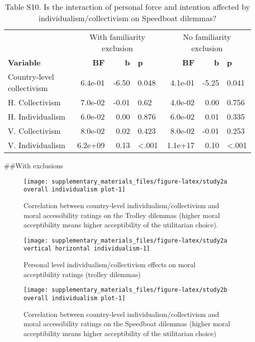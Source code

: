 \documentclass[
]{article}
\begin{document}
\begin{table}[H]

\caption{\label{tab:analysis individual + country level study 2b}Table S10. Is the interaction of personal force and intention affected by individualism/collectivism on Speedboat dilemmas?}
\begin{tabular}[t]{lrrlrrl}
\toprule
\multicolumn{1}{c}{ } & \multicolumn{3}{c}{With familiarity exclusion} & \multicolumn{3}{c}{No familiarity exclusion} \\
\cmidrule(l{3pt}r{3pt}){2-4} \cmidrule(l{3pt}r{3pt}){5-7}
\textbf{Variable} & \textbf{BF} & \textbf{b} & \textbf{p} & \textbf{BF} & \textbf{b} & \textbf{p}\\
\midrule
Country-level collectivism & 6.4e-01 & -6.50 & 0.048 & 4.1e-01 & -5.25 & 0.041\\
H. Collectivism & 7.0e-02 & -0.01 & 0.62 & 4.0e-02 & 0.00 & 0.756\\
H. Individualism & 6.0e-02 & 0.00 & 0.876 & 6.0e-02 & 0.01 & 0.335\\
V. Collectivism & 8.0e-02 & 0.02 & 0.423 & 8.0e-02 & -0.01 & 0.253\\
V. Individualism & 6.2e+09 & 0.13 & <.001 & 1.1e+17 & 0.10 & <.001\\
\bottomrule
\end{tabular}
\end{table}

\#\#With exclusions

\begin{figure}[H]
\texttt{[image: supplementary\_materials\_files/figure-latex/study2a overall individualism plot-1]} \caption{Correlation between country-level individualism/collectivism and moral accessibility ratings on the Trolley dilemmas (higher moral acceptibility means higher acceptibility of the utilitarian choice).}\label{fig:study2a overall individualism plot}
\end{figure}

\begin{figure}
\texttt{[image: supplementary\_materials\_files/figure-latex/study2a vertical horizontal individualism-1]} \caption{Personal level individualism/collectivism effects on moral acceptibility ratings (trolley dilemmas)}\label{fig:study2a vertical horizontal individualism}
\end{figure}

\begin{figure}[H]
\texttt{[image: supplementary\_materials\_files/figure-latex/study2b overall individualism plot-1]} \caption{Correlation between country-level individualism/collectivism and moral accessibility ratings on the Speedboat dilemmas (higher moral acceptibility means higher acceptibility of the utilitarian choice)}\label{fig:study2b overall individualism plot}
\end{figure}
\end{document}
